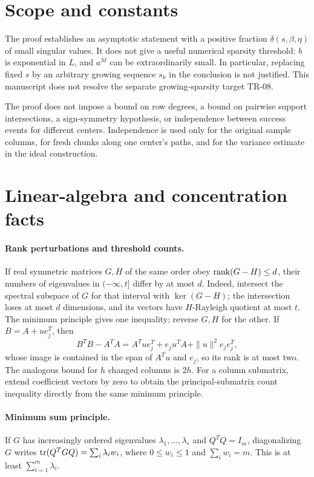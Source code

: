 \documentclass[11pt]{article}
\theoremstyle{remark}\newtheorem{remark}[theorem]{Remark}
\begin{document}
\section{Scope and constants}
The proof establishes an asymptotic statement with a positive fraction $\delta(s,\beta,\eta)$ of small singular values. It does not give a useful numerical sparsity threshold: $b$ is exponential in $L$, and $a^M$ can be extraordinarily small. In particular, replacing fixed $s$ by an arbitrary growing sequence $s_k$ in the conclusion is not justified. This manuscript does not resolve the separate growing-sparsity target TR-08.

The proof does not impose a bound on row degrees, a bound on pairwise support intersections, a sign-symmetry hypothesis, or independence between success events for different centers. Independence is used only for the original sample columns, for fresh chunks along one center's paths, and for the variance estimate in the ideal construction.

\appendix
\section{Linear-algebra and concentration facts}
\paragraph{Rank perturbations and threshold counts.}
If real symmetric matrices $G,H$ of the same order obey $\operatorname{rank}(G-H)\le d$, their numbers of eigenvalues in $(-\infty,t]$ differ by at most $d$. Indeed, intersect the spectral subspace of $G$ for that interval with $\ker(G-H)$; the intersection loses at most $d$ dimensions, and its vectors have $H$-Rayleigh quotient at most $t$. The minimum principle gives one inequality; reverse $G,H$ for the other. If $B=A+ue_j^T$, then
\[
 B^TB-A^TA=A^Tue_j^T+e_ju^TA+\|u\|^2e_je_j^T,
\]
whose image is contained in the span of $A^Tu$ and $e_j$, so its rank is at most two. The analogous bound for $h$ changed columns is $2h$. For a column submatrix, extend coefficient vectors by zero to obtain the principal-submatrix count inequality directly from the same minimum principle.

\paragraph{Minimum sum principle.}
If $G$ has increasingly ordered eigenvalues $\lambda_1,\ldots,\lambda_r$ and $Q^TQ=I_m$, diagonalizing $G$ writes $\operatorname{tr}(Q^TGQ)=\sum_i\lambda_iw_i$, where $0\le w_i\le1$ and $\sum_iw_i=m$. This is at least $\sum_{i=1}^m\lambda_i$.
\end{document}
